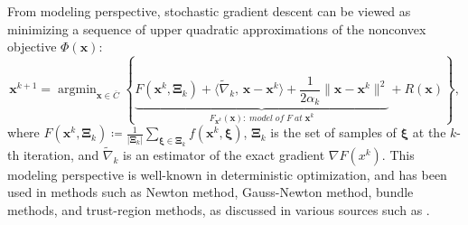 \documentclass[twoside,11pt]{article}
\DeclareMathOperator*{\argmin}{argmin}
\def\inprod#1#2{\langle#1,\,#2\rangle}
\def\vx{{\bm{x}}}
\begin{document}
From modeling perspective, stochastic gradient descent can be viewed as minimizing a sequence of upper quadratic approximations of the nonconvex objective $\Phi(\vx)$:
\begin{equation}
{\vx^{k+1}}=\argmin_{\vx\in \overline{C}}\left\{\underbrace{F({\vx^k},{\bm\Xi}_{k})+\inprod{\widetilde\nabla_k}{\vx-{\vx^k}}+\frac{1}{2\alpha_k}\|\vx-{\vx^k}\|^2}_{F_{{\vx^k}}(\vx):\;model\;of\;F\;at\;{\vx^k}}+R(\vx)\right\},
\label{convention-model} 
\end{equation}
where $F(\vx^k,{\bm\Xi}_k)\coloneqq\frac{1}{|{\bm\Xi}_k|}\sum_{{\bm\xi}\in{\bm\Xi}_k}f(\vx^k,{\bm\xi})$, ${\bm\Xi_k}$ is the set of samples of ${\bm\xi}$ at the $k$-th iteration, and $\widetilde{\nabla}_k$ is an estimator of the exact gradient $\nabla F(x^k)$. This modeling perspective is well-known in deterministic optimization, and has been used in methods such as Newton method, Gauss-Newton method, bundle methods, and trust-region methods, as discussed in various sources such as \citet{hiriart1993convex,nesterov2003introductory,lin2007trust,paren2022stochastic}.
\end{document}
